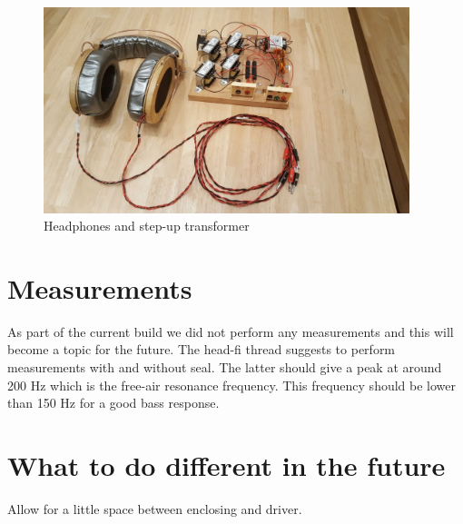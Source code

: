 \documentclass{article}
\begin{document}
\begin{figure}[htb]
    \centering
    \includegraphics[width=0.95\textwidth]{images/headphones_and_amp.jpg}
    \caption{Headphones and step-up transformer}
    \label{f:amp:all}
\end{figure}

%
%
%
%

\section{Measurements}
\label{s:measurements}

As part of the current build we did not perform any measurements and this will become a topic for the future. The head-fi thread suggests to perform measurements with and without seal. The latter should give a peak at around 200 Hz which is the free-air resonance frequency. This frequency should be lower than 150 Hz for a good bass response.

\section{What to do different in the future}
\label{s:future}

Allow for a little space between enclosing and driver.
\end{document}
